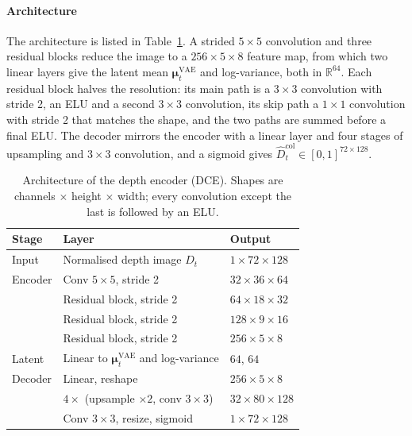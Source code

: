 \paragraph{Architecture}
The architecture is listed in Table~\ref{tab:dce}. A strided $5\times5$ convolution and three residual blocks reduce the image to a $256\times5\times8$ feature map, from which two linear layers give the latent mean $\boldsymbol{\mu}^{\mathrm{VAE}}_t$ and log-variance, both in $\mathbb{R}^{64}$. Each residual block halves the resolution: its main path is a $3\times3$ convolution with stride 2, an ELU and a second $3\times3$ convolution, its skip path a $1\times1$ convolution with stride 2 that matches the shape, and the two paths are summed before a final ELU. The decoder mirrors the encoder with a linear layer and four stages of upsampling and $3\times3$ convolution, and a sigmoid gives $\hat D^{\mathrm{col}}_t \in [0,1]^{72\times128}$.

\begin{table}[ht]
\centering
\caption{Architecture of the depth encoder (DCE). Shapes are channels $\times$ height $\times$ width; every convolution except the last is followed by an ELU.}
\label{tab:dce}
\begin{tabular}{@{}lll@{}}
\toprule
Stage & Layer & Output \\
\midrule
Input     & Normalised depth image $D_t$ & $1\times72\times128$ \\
Encoder   & Conv $5\times5$, stride 2 & $32\times36\times64$ \\
          & Residual block, stride 2 & $64\times18\times32$ \\
          & Residual block, stride 2 & $128\times9\times16$ \\
          & Residual block, stride 2 & $256\times5\times8$ \\
Latent    & Linear to $\boldsymbol{\mu}^{\mathrm{VAE}}_t$ and log-variance & $64$, $64$ \\
Decoder   & Linear, reshape & $256\times5\times8$ \\
          & $4\times$ (upsample $\times2$, conv $3\times3$) & $32\times80\times128$ \\
          & Conv $3\times3$, resize, sigmoid & $1\times72\times128$ \\
\bottomrule
\end{tabular}
\end{table}

